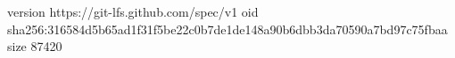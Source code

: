 version https://git-lfs.github.com/spec/v1
oid sha256:316584d5b65ad1f31f5be22c0b7de1de148a90b6dbb3da70590a7bd97c75fbaa
size 87420
